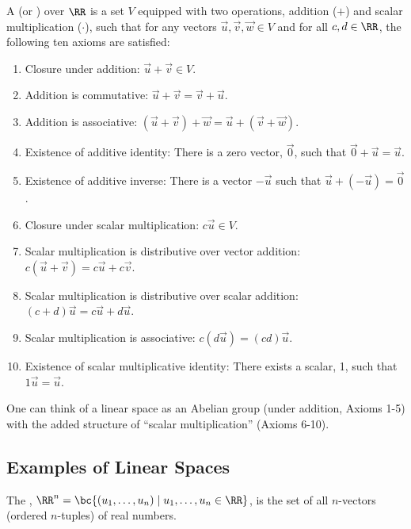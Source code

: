 \begin{definition}
    A  (or ) over $\RR$ is a set $V$ equipped with two operations, addition ($+$) and scalar multiplication ($\cdot$), such that for any vectors $\vec u, \vec v, \vec w \in V$ and for all $c, d \in \RR$, the following ten axioms are satisfied:
    \begin{enumerate}
        \item Closure under addition: $\vec u + \vec v \in V$.
        \item Addition is commutative: $\vec u + \vec v = \vec v + \vec u$.
        \item Addition is associative: $(\vec u + \vec v) + \vec w = \vec u + (\vec v + \vec w)$.
        \item Existence of additive identity: There is a zero vector, $\vec 0$, such that $\vec 0 + \vec u = \vec u$.
        \item Existence of additive inverse: There is a vector $-\vec u$ such that $\vec u + (-\vec u) = \vec 0$.
        \item Closure under scalar multiplication: $c\vec u \in V$.
        \item Scalar multiplication is distributive over vector addition: $c(\vec u + \vec v) = c \vec u + c \vec v$.
        \item Scalar multiplication is distributive over scalar addition: $(c + d) \vec u = c \vec u + d \vec u$.
        \item Scalar multiplication is associative: $c(d \vec u) = (cd) \vec u$.
        \item Existence of scalar multiplicative identity: There exists a scalar, 1, such that $1 \vec u = \vec u$.
    \end{enumerate}
\end{definition}

One can think of a linear space as an Abelian group (under addition, Axioms 1-5) with the added structure of ``scalar multiplication'' (Axioms 6-10).

\subsection{Examples of Linear Spaces}\label{subsec:linear-space-eg}

\begin{definition}
    The , $\RR^n = \bc{(u_1, \dots, u_n) \mid u_1, \dots, u_n \in \RR}$, is the set of all $n$-vectors (ordered $n$-tuples) of real numbers.
\end{definition}

